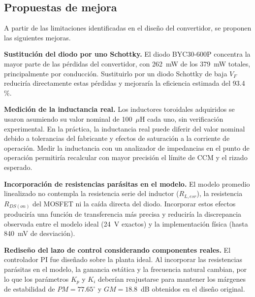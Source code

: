 \documentclass[conference]{IEEEtran}
\begin{document}
\subsection{Propuestas de mejora}

A partir de las limitaciones identificadas en el diseño del convertidor,
se proponen las siguientes mejoras.

\textbf{Sustitución del diodo por uno Schottky.} El diodo BYC30-600P
concentra la mayor parte de las pérdidas del convertidor, con
262~mW de los 379~mW totales, principalmente por conducción.
Sustituirlo por un diodo Schottky de baja $V_F$ reduciría directamente
estas pérdidas y mejoraría la eficiencia estimada del 93.4\,\%.

\textbf{Medición de la inductancia real.} Los inductores toroidales
adquiridos se usaron asumiendo su valor nominal de 100~$\mu$H cada uno,
sin verificación experimental. En la práctica, la inductancia real puede
diferir del valor nominal debido a tolerancias del fabricante y efectos
de saturación a la corriente de operación. Medir la inductancia con un
analizador de impedancias en el punto de operación permitiría recalcular
con mayor precisión el límite de CCM y el rizado esperado.

\textbf{Incorporación de resistencias parásitas en el modelo.} El modelo
promedio linealizado no contempla la resistencia serie del inductor
($R_{L,esr}$), la resistencia $R_{DS(on)}$ del MOSFET ni la caída directa
del diodo. Incorporar estos efectos produciría una función de transferencia
más precisa y reduciría la discrepancia observada entre el modelo ideal
(24~V exactos) y la implementación física (hasta 840~mV de desviación).

\textbf{Rediseño del lazo de control considerando componentes reales.}
El controlador PI fue diseñado sobre la planta ideal. Al incorporar las
resistencias parásitas en el modelo, la ganancia estática y la frecuencia
natural cambian, por lo que los parámetros $K_p$ y $K_i$ deberían
reajustarse para mantener los márgenes de estabilidad de
$PM = 77.65^\circ$ y $GM = 18.8$~dB obtenidos en el diseño original.


\end{document}
